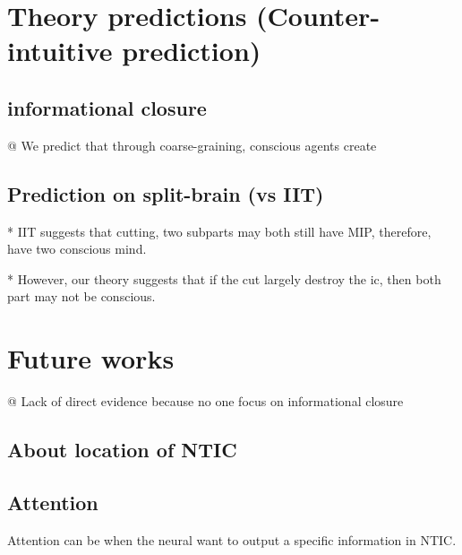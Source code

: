 \documentclass[utf8]{article}
\newenvironment{ants}
			{
			 \begin{easylist}[itemize]		
		 	}
			{
			\end{easylist}
			}
\begin{document}
		
		
	\section{Theory predictions (Counter-intuitive prediction)}	
	
		\subsection{informational closure}
			\begin{ants}
				@ We predict that through coarse-graining, conscious agents create 
			\end{ants}
			
			
		
		\subsection{Prediction on split-brain (vs IIT)}
			* IIT suggests that cutting, two subparts may both still have MIP, therefore, have two conscious mind. 
			
			* However, our theory suggests that if the cut largely destroy the \ac{ic}, then both part may not be conscious. 
	
	
	

	
	
	
	\section{Future works}
		\begin{ants}
			
			@ Lack of direct evidence because no one focus on informational closure
			
			
		\end{ants}
	
		\subsection{About location of NTIC}
		\subsection{Attention}
			Attention can be when the neural want to output a specific information in NTIC. 
		
		
\end{document}
